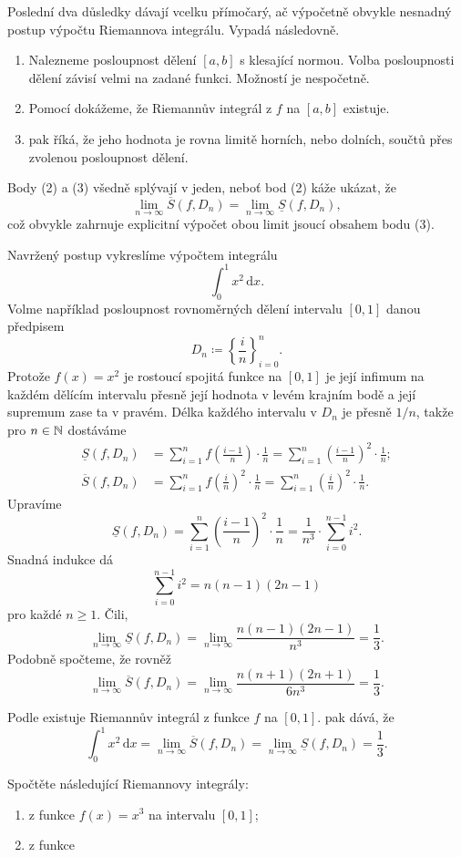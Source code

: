 \begin{example}{}{}
 Poslední dva důsledky dávají vcelku přímočarý, ač výpočetně obvykle nesnadný
 postup výpočtu Riemannova integrálu. Vypadá následovně.
 \begin{enumerate}
  \item Nalezneme posloupnost dělení $[a,b]$ s klesající normou. Volba
    posloupnosti dělení závisí velmi na zadané funkci. Možností je
   nespočetně.
  \item Pomocí  dokážeme, že Riemannův
   integrál z $f$ na $[a,b]$ existuje.
  \item {} pak říká, že jeho hodnota je rovna
   limitě horních, nebo dolních, součtů přes zvolenou posloupnost dělení.
 \end{enumerate}
 Body (2) a (3) všedně splývají v jeden, neboť bod (2) káže ukázat, že
 \[
  \lim_{n \to \infty} \overline{S}(f,D_n) = \lim_{n \to \infty}
  \underline{S}(f,D_n),
 \]
 což obvykle zahrnuje explicitní výpočet obou limit jsoucí obsahem bodu (3).

 Navržený postup vykreslíme výpočtem integrálu
 \[
  \int_{0}^{1} x^2 \, \mathrm{d}x.
 \]
 Volme například posloupnost rovnoměrných dělení intervalu $[0,1]$ danou
 předpisem
 \[
  D_n \coloneqq \left\{\frac{i}{n}\right\}_{i=0}^n.
 \]
 Protože $f(x) = x^2$ je rostoucí spojitá funkce na $[0,1]$ je její infimum na
 každém dělícím intervalu přesně její hodnota v levém krajním bodě a její
 supremum zase ta v pravém. Délka každého intervalu v $D_n$ je přesně $1 / n$,
 takže pro $n \in \mathbb{N}$ dostáváme
 \begin{align*}
  \underline{S}(f,D_n) &= \sum_{i=1}^{n} f \left( \frac{i-1}{n} \right) \cdot
  \frac{1}{n} = \sum_{i=1}^{n} \left( \frac{i-1}{n} \right)^2 \cdot
  \frac{1}{n};\\
  \overline{S}(f,D_n) &= \sum_{i=1}^{n} f \left( \frac{i}{n} \right)^2 \cdot
  \frac{1}{n} = \sum_{i=1}^{n} \left( \frac{i}{n} \right)^2 \cdot \frac{1}{n}.
 \end{align*}
 Upravíme
 \[
  \underline{S}(f,D_n) = \sum_{i = 1}^{n} \left( \frac{i-1}{n} \right)^2 \cdot
  \frac{1}{n} = \frac{1}{n^3} \cdot \sum_{i=0}^{n-1} i^2.
 \]
 Snadná indukce dá
 \[
  \sum_{i=0}^{n-1} i^2 = n(n-1)(2n-1)
 \]
 pro každé $n \geq 1$. Čili,
 \[
  \lim_{n \to \infty} \underline{S}(f,D_n) = \lim_{n \to \infty}
  \frac{n(n-1)(2n-1)}{n^3} = \frac{1}{3}.
 \]
 Podobně spočteme, že rovněž
 \[
  \lim_{n \to \infty} \overline{S}(f,D_n) = \lim_{n \to \infty}
  \frac{n(n+1)(2n+1)}{6n^3} = \frac{1}{3}.
 \]
 
 Podle  existuje Riemannův integrál z
 funkce $f$ na $[0,1]$.  pak dává, že
 \[
  \int_{0}^{1} x^2 \, \mathrm{d}x = \lim_{n \to \infty} \overline{S}(f,D_n) =
  \lim_{n \to \infty} \underline{S}(f,D_n) = \frac{1}{3}.
 \]
\end{example}

\begin{exercise}{}{}
 Spočtěte následující Riemannovy integrály:
 \begin{enumerate}
  \item z funkce $f(x) = x^3$ na intervalu $[0,1]$;
  \item z funkce 
 \end{enumerate}
\end{exercise}
